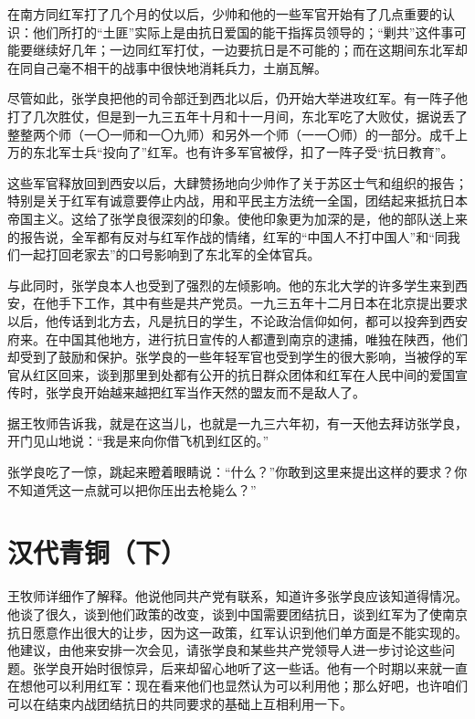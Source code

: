 \documentclass[10pt]{book}
\begin{document}
在南方同红军打了几个月的仗以后，少帅和他的一些军官开始有了几点重要的认识：他们所打的“土匪”实际上是由抗日爱国的能干指挥员领导的；“剿共”这件事可能要继续好几年；一边同红军打仗，一边要抗日是不可能的；而在这期间东北军却在同自己毫不相干的战事中很快地消耗兵力，土崩瓦解。

尽管如此，张学良把他的司令部迁到西北以后，仍开始大举进攻红军。有一阵子他打了几次胜仗，但是到一九三五年十月和十一月间，东北军吃了大败仗，据说丢了整整两个师（一〇一师和一〇九师）和另外一个师（一一〇师）的一部分。成千上万的东北军士兵“投向了”红军。也有许多军官被俘，扣了一阵子受“抗日教育”。

这些军官释放回到西安以后，大肆赞扬地向少帅作了关于苏区士气和组织的报告；特别是关于红军有诚意要停止内战，用和平民主方法统一全国，团结起来抵抗日本帝国主义。这给了张学良很深刻的印象。使他印象更为加深的是，他的部队送上来的报告说，全军都有反对与红军作战的情绪，红军的“中国人不打中国人”和“同我们一起打回老家去”的口号影响到了东北军的全体官兵。

与此同时，张学良本人也受到了强烈的左倾影响。他的东北大学的许多学生来到西安，在他手下工作，其中有些是共产党员。一九三五年十二月日本在北京提出要求以后，他传话到北方去，凡是抗日的学生，不论政治信仰如何，都可以投奔到西安府来。在中国其他地方，进行抗日宣传的人都遭到南京的逮捕，唯独在陕西，他们却受到了鼓励和保护。张学良的一些年轻军官也受到学生的很大影响，当被俘的军官从红区回来，谈到那里到处都有公开的抗日群众团体和红军在人民中间的爱国宣传时，张学良开始越来越把红军当作天然的盟友而不是敌人了。

据王牧师告诉我，就是在这当儿，也就是一九三六年初，有一天他去拜访张学良，开门见山地说：“我是来向你借飞机到红区的。”

张学良吃了一惊，跳起来瞪着眼睛说：“什么？”你敢到这里来提出这样的要求？你不知道凭这一点就可以把你压出去枪毙么？”



\section{汉代青铜（下）}

王牧师详细作了解释。他说他同共产党有联系，知道许多张学良应该知道得情况。他谈了很久，谈到他们政策的改变，谈到中国需要团结抗日，谈到红军为了使南京抗日愿意作出很大的让步，因为这一政策，红军认识到他们单方面是不能实现的。他建议，由他来安排一次会见，请张学良和某些共产党领导人进一步讨论这些问题。张学良开始时很惊异，后来却留心地听了这一些话。他有一个时期以来就一直在想他可以利用红军：现在看来他们也显然认为可以利用他；那么好吧，也许咱们可以在结束内战团结抗日的共同要求的基础上互相利用一下。
\end{document}
